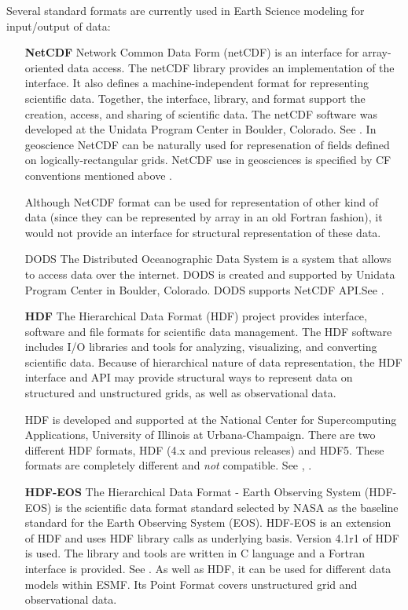 Several standard formats are currently used in Earth Science modeling
for input/output of data:

\begin{itemize}
\item[\bf NetCDF] Network Common Data Form (netCDF) is an interface for 
array-oriented data access. The netCDF library provides an
implementation of the interface. It also defines a 
machine-independent format for representing scientific data. Together,
the interface, library, and format support the creation, access, and
sharing of scientific data. The netCDF software was developed at the
Unidata Program Center in Boulder, Colorado. See \cite{NetCDF3_UsersGuide_C}.
In geoscience NetCDF can be naturally used for represenation of fields 
defined on logically-rectangular grids. NetCDF use in geosciences is 
specified by CF conventions mentioned above \cite{NetCDF_CF_v1_beta3}.

Although NetCDF format can be used for representation of other kind of data 
(since they can be represented by array in an old Fortran fashion), it would 
not provide an interface for structural representation of these data. 

\item[DODS] The Distributed Oceanographic Data System is a system that allows 
to access data over the internet. DODS is created and supported by Unidata 
Program Center in Boulder, Colorado. DODS supports NetCDF API.See \cite{DODS}.

\item[\bf HDF] The Hierarchical Data Format (HDF) project provides
interface,  software and file formats for scientific data management. 
The HDF software includes I/O libraries and tools for analyzing,
visualizing, and converting scientific data. Because of hierarchical nature 
of data representation, the HDF interface and API may provide structural ways 
to represent data on structured and unstructured grids, as well as 
observational data. 

HDF is developed and supported at the National Center for Supercomputing 
Applications, University of Illinois at Urbana-Champaign. There are two 
different HDF formats, HDF (4.x and previous releases) and HDF5. These 
formats are completely different and {\it not} compatible.  See
\cite{HDF4_tutorials}, \cite{HDF5_tutorial}.

\item[\bf HDF-EOS]  The Hierarchical Data Format - Earth Observing
System (HDF-EOS) is the scientific data format standard selected by
NASA as the baseline standard for the Earth Observing System (EOS). HDF-EOS
is an extension of HDF and uses HDF library calls as underlying
basis. Version 4.1r1 of HDF is used. The library and tools are written
in C language and a Fortran interface is provided. See \cite{HDF-EOS}.
As well as HDF, it can be used for different data models within ESMF. Its 
Point Format covers unstructured grid and observational data.


\end{itemize}

